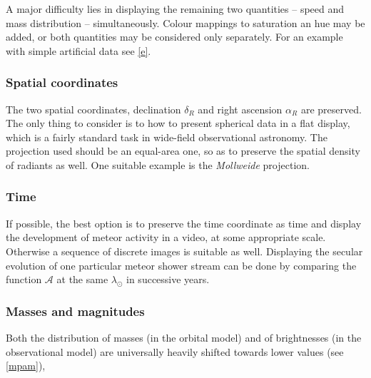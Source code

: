         A major difficulty lies in displaying the remaining two quantities -- speed and mass distribution -- simultaneously.
        Colour mappings to saturation an hue may be added, or both quantities may be considered only separately.
        For an example with simple artificial data see \cref{e}.

        \subsubsection{Spatial coordinates} \label{iovs}
            The two spatial coordinates, declination $\delta_R$ and right ascension $\alpha_R$ are preserved.
            The only thing to consider is to how to present spherical data in a flat display,
            which is a fairly standard task in wide-field observational astronomy.
            The projection used should be an equal-area one, so as to preserve the spatial density of radiants as well.
            One suitable example is the \emph{Mollweide} projection.


        \subsubsection{Time} \label{iovt}
            If possible, the best option is to preserve the time coordinate as time
            and display the development of meteor activity in a video, at some appropriate scale.
            Otherwise a sequence of discrete images is suitable as well.
            Displaying the secular evolution of one particular meteor shower stream can be done
            by comparing the function $\mathcal{A}$ at the same $\lambda_\odot$ in successive years.

        \subsubsection{Masses and magnitudes} \label{iovm}
            Both the distribution of masses (in the orbital model) and of brightnesses (in the observational model)
            are universally heavily shifted towards lower values (see \cref{mpam}),

